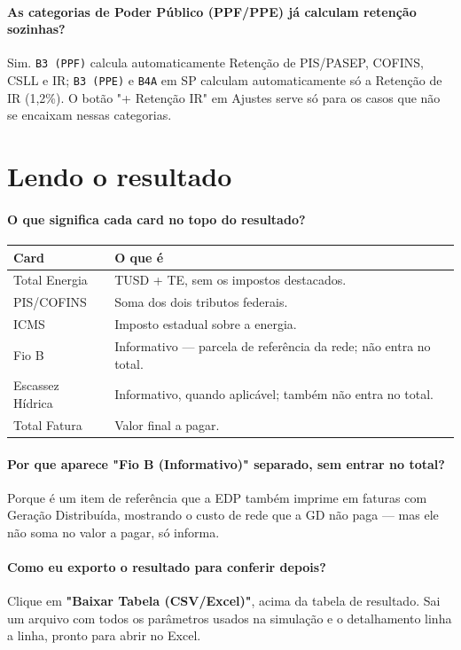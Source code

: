 \documentclass[11pt,a4paper]{article}
\newcommand{\campo}[1]{\texttt{\small #1}}
\begin{document}
\paragraph{As categorias de Poder Público (PPF/PPE) já calculam retenção sozinhas?}
Sim. \campo{B3 (PPF)} calcula automaticamente Retenção de PIS/PASEP, COFINS, CSLL e IR; \campo{B3 (PPE)} e \campo{B4A} em SP calculam automaticamente só a Retenção de IR (1,2\%). O botão "+ Retenção IR" em Ajustes serve só para os casos que não se encaixam nessas categorias.

\section{Lendo o resultado}

\paragraph{O que significa cada card no topo do resultado?}
\begin{center}
\begin{tabularx}{\textwidth}{@{}l >{\raggedright\arraybackslash}X@{}}
\toprule
\textbf{Card} & \textbf{O que é} \\
\midrule
Total Energia & TUSD + TE, sem os impostos destacados. \\
PIS/COFINS & Soma dos dois tributos federais. \\
ICMS & Imposto estadual sobre a energia. \\
Fio B & Informativo --- parcela de referência da rede; não entra no total. \\
Escassez Hídrica & Informativo, quando aplicável; também não entra no total. \\
Total Fatura & Valor final a pagar. \\
\bottomrule
\end{tabularx}
\end{center}

\paragraph{Por que aparece "Fio B (Informativo)" separado, sem entrar no total?}
Porque é um item de referência que a EDP também imprime em faturas com Geração Distribuída, mostrando o custo de rede que a GD não paga --- mas ele não soma no valor a pagar, só informa.

\paragraph{Como eu exporto o resultado para conferir depois?}
Clique em \textbf{"Baixar Tabela (CSV/Excel)"}, acima da tabela de resultado. Sai um arquivo com todos os parâmetros usados na simulação e o detalhamento linha a linha, pronto para abrir no Excel.
\end{document}
